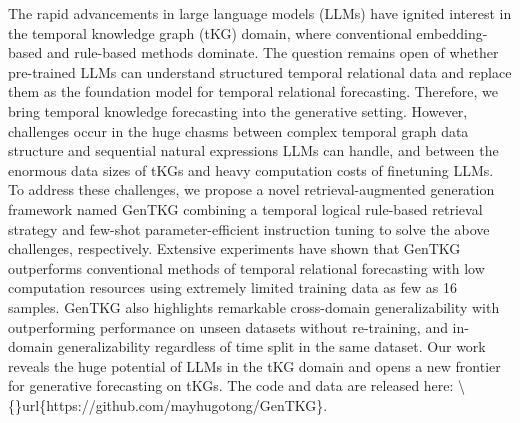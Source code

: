 The rapid advancements in large language models (LLMs) have ignited interest in the temporal knowledge graph (tKG) domain, where conventional embedding-based and rule-based methods dominate. The question remains open of whether pre-trained LLMs can understand structured temporal relational data and replace them as the foundation model for temporal relational forecasting. Therefore, we bring temporal knowledge forecasting into the generative setting. However, challenges occur in the huge chasms between complex temporal graph data structure and sequential natural expressions LLMs can handle, and between the enormous data sizes of tKGs and heavy computation costs of finetuning LLMs. To address these challenges, we propose a novel retrieval-augmented generation framework named GenTKG combining a temporal logical rule-based retrieval strategy and few-shot parameter-efficient instruction tuning to solve the above challenges, respectively. Extensive experiments have shown that GenTKG outperforms conventional methods of temporal relational forecasting with low computation resources using extremely limited training data as few as 16 samples. GenTKG also highlights remarkable cross-domain generalizability with outperforming performance on unseen datasets without re-training, and in-domain generalizability regardless of time split in the same dataset. Our work reveals the huge potential of LLMs in the tKG domain and opens a new frontier for generative forecasting on tKGs. The code and data are released here:  \textbackslash\{\}url\{https://github.com/mayhugotong/GenTKG\}.